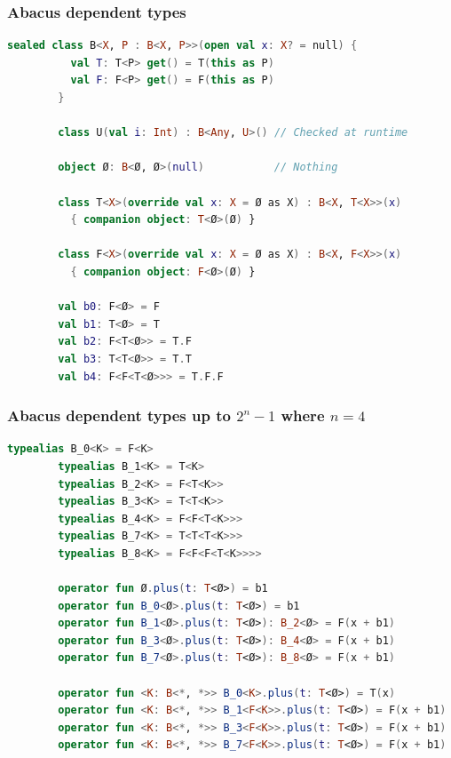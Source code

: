 \documentclass{beamer}
\begin{document}
\begin{frame}
    \begin{frame}[fragile]
        \frametitle{Abacus dependent types}
        \begin{lstlisting}[language=Kotlin, gobble=7]
        sealed class B<X, P : B<X, P>>(open val x: X? = null) {
          val T: T<P> get() = T(this as P)
          val F: F<P> get() = F(this as P)
        }

        class U(val i: Int) : B<Any, U>() // Checked at runtime

        object Ø: B<Ø, Ø>(null)           // Nothing

        class T<X>(override val x: X = Ø as X) : B<X, T<X>>(x)
          { companion object: T<Ø>(Ø) }

        class F<X>(override val x: X = Ø as X) : B<X, F<X>>(x)
          { companion object: F<Ø>(Ø) }

        val b0: F<Ø> = F
        val b1: T<Ø> = T
        val b2: F<T<Ø>> = T.F
        val b3: T<T<Ø>> = T.T
        val b4: F<F<T<Ø>>> = T.F.F
        \end{lstlisting}
    \end{frame}

    \begin{frame}[fragile]
        \frametitle{Abacus dependent types up to $2^n-1$ where $n=4$}
        \begin{lstlisting}[language=Kotlin, gobble=7]
        typealias B_0<K> = F<K>
        typealias B_1<K> = T<K>
        typealias B_2<K> = F<T<K>>
        typealias B_3<K> = T<T<K>>
        typealias B_4<K> = F<F<T<K>>>
        typealias B_7<K> = T<T<T<K>>>
        typealias B_8<K> = F<F<F<T<K>>>>

        operator fun Ø.plus(t: T<Ø>) = b1
        operator fun B_0<Ø>.plus(t: T<Ø>) = b1
        operator fun B_1<Ø>.plus(t: T<Ø>): B_2<Ø> = F(x + b1)
        operator fun B_3<Ø>.plus(t: T<Ø>): B_4<Ø> = F(x + b1)
        operator fun B_7<Ø>.plus(t: T<Ø>): B_8<Ø> = F(x + b1)

        operator fun <K: B<*, *>> B_0<K>.plus(t: T<Ø>) = T(x)
        operator fun <K: B<*, *>> B_1<F<K>>.plus(t: T<Ø>) = F(x + b1)
        operator fun <K: B<*, *>> B_3<F<K>>.plus(t: T<Ø>) = F(x + b1)
        operator fun <K: B<*, *>> B_7<F<K>>.plus(t: T<Ø>) = F(x + b1)
        \end{lstlisting}
    \end{frame}


\end{frame}
\end{document}

